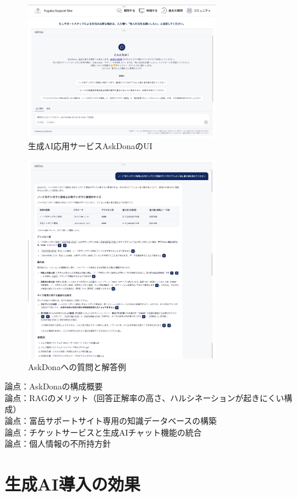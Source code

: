\documentclass{jsaxiesproc}
\begin{document}
\begin{figure}[htbp]
\includegraphics[width=8.5cm]{figs/AskDona-Chat-1.jpg}
\caption{生成AI応用サービスAskDonaのUI}
\label{fig:AskDona-Chat-1.jpg}
\end{figure}


\begin{figure}[htbp]
\includegraphics[width=8.5cm]{figs/AskDona-Answer.jpg}
\caption{AskDonaへの質問と解答例}
\label{fig:AskDona-Answer.jpg}
\end{figure}


論点：AskDonaの構成概要\\
論点：RAGのメリット（回答正解率の高さ、ハルシネーションが起きにくい構成）\\
論点：富岳サポートサイト専用の知識データベースの構築\\
論点：チケットサービスと生成AIチャット機能の統合\\
論点：個人情報の不所持方針\\


\section{生成AI導入の効果}
\end{document}
